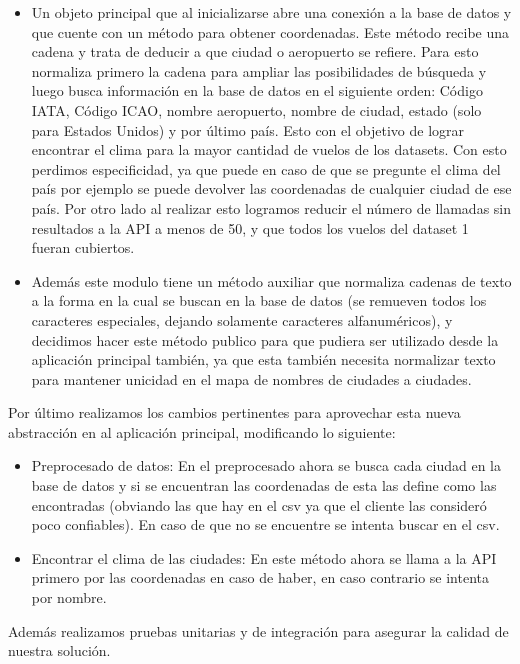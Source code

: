 \documentclass{report}
\begin{document}
\begin{itemize}
    \item Un objeto principal que al inicializarse abre una conexión a la base de datos y que cuente con un método para obtener coordenadas. Este método recibe una cadena y trata de deducir a que ciudad o aeropuerto se refiere. Para esto normaliza primero la cadena para ampliar las posibilidades de búsqueda y luego busca información en la base de datos en el siguiente orden: Código IATA, Código ICAO, nombre aeropuerto, nombre de ciudad, estado (solo para Estados Unidos) y por último país. Esto con el objetivo de lograr encontrar el clima para la mayor cantidad de vuelos de los datasets. Con esto perdimos especificidad, ya que puede en caso de que se pregunte el clima del país por ejemplo se puede devolver las coordenadas de cualquier ciudad de ese país. Por otro lado al realizar esto logramos reducir el número de llamadas sin resultados a la API a menos de 50, y que todos los vuelos del dataset 1 fueran cubiertos.
    \item Además este modulo tiene un método auxiliar que normaliza cadenas de texto a la forma en la cual se buscan en la base de datos (se remueven todos los caracteres especiales, dejando solamente caracteres alfanuméricos), y decidimos hacer este método publico para que pudiera ser utilizado desde la aplicación principal también, ya que esta también necesita normalizar texto para mantener unicidad en el mapa de nombres de ciudades a ciudades.
\end{itemize}
Por último realizamos los cambios pertinentes para aprovechar esta nueva abstracción en al aplicación principal, modificando lo siguiente:
\begin{itemize}
    \item Preprocesado de datos: En el preprocesado ahora se busca cada ciudad en la base de datos y si se encuentran las coordenadas de esta las define como las encontradas (obviando las que hay en el csv ya que el cliente las consideró poco confiables). En caso de que no se encuentre se intenta buscar en el csv.
    \item Encontrar el clima de las ciudades: En este método ahora se llama a la API primero por las coordenadas en caso  de haber, en caso contrario se intenta por nombre.
\end{itemize}
Además realizamos pruebas unitarias y de integración para asegurar la calidad de nuestra solución.
\end{document}
